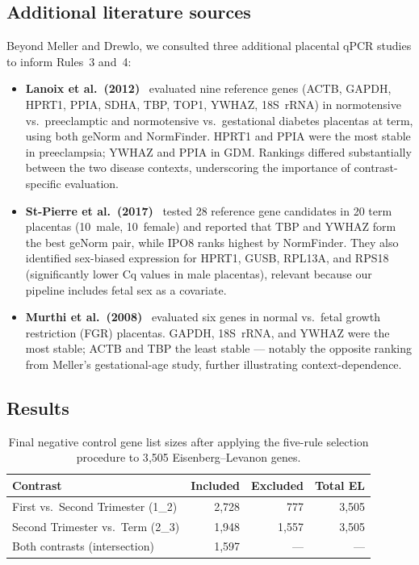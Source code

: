 \documentclass[11pt,a4paper]{article}
\begin{document}
\subsection{Additional literature sources}

Beyond Meller and Drewlo, we consulted three additional placental
qPCR studies to inform Rules~3 and~4:

\begin{itemize}
  \item \textbf{Lanoix et al.\ (2012)}~\cite{lanoix2012} evaluated
        nine reference genes (ACTB, GAPDH, HPRT1, PPIA, SDHA, TBP,
        TOP1, YWHAZ, 18S~rRNA) in normotensive vs.\ preeclamptic and
        normotensive vs.\ gestational diabetes placentas at term,
        using both geNorm and NormFinder.  HPRT1 and PPIA were the
        most stable in preeclampsia; YWHAZ and PPIA in GDM.
        Rankings differed substantially between the two disease
        contexts, underscoring the importance of contrast-specific
        evaluation.

  \item \textbf{St-Pierre et al.\ (2017)}~\cite{stpierre2017}
        tested 28 reference gene candidates in 20 term placentas
        (10~male, 10~female) and reported that TBP and YWHAZ form
        the best geNorm pair, while IPO8 ranks highest by NormFinder.
        They also identified sex-biased expression for HPRT1, GUSB,
        RPL13A, and RPS18 (significantly lower Cq values in male
        placentas), relevant because our pipeline includes fetal sex
        as a covariate.

  \item \textbf{Murthi et al.\ (2008)}~\cite{murthi2008} evaluated
        six genes in normal vs.\ fetal growth restriction (FGR)
        placentas.  GAPDH, 18S~rRNA, and YWHAZ were the most stable;
        ACTB and TBP the least stable --- notably the opposite ranking
        from Meller's gestational-age study, further illustrating
        context-dependence.
\end{itemize}

\subsection{Results}

\begin{table}[htbp]
\centering
\caption{Final negative control gene list sizes after applying the
  five-rule selection procedure to 3{,}505 Eisenberg--Levanon genes.}
\label{tab:ruvcounts}
\begin{tabular}{lrrr}
\toprule
\textbf{Contrast} & \textbf{Included} & \textbf{Excluded} & \textbf{Total EL} \\
\midrule
First vs.\ Second Trimester (1\_2) & 2{,}728 & 777 & 3{,}505 \\
Second Trimester vs.\ Term (2\_3)  & 1{,}948 & 1{,}557 & 3{,}505 \\
Both contrasts (intersection)       & 1{,}597 & ---    & ---     \\
\bottomrule
\end{tabular}
\end{table}
\end{document}
